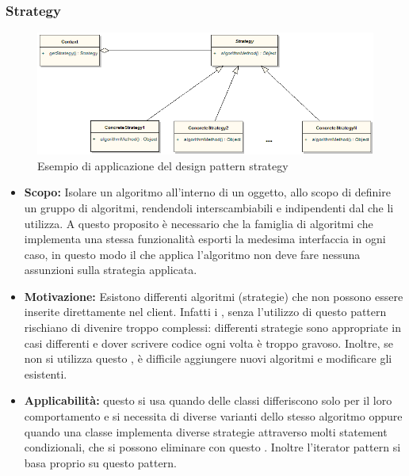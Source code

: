 \documentclass{scalatekids-article}
\begin{document}
\subsubsection{Strategy}
\begin{figure}[H]
	\begin{center}
		\includegraphics[width=1.0\textwidth, keepaspectratio]{img/designPattern/StrategyPattern.png}
		\caption{Esempio di applicazione del design pattern strategy}
	\end{center}
\end{figure}
\begin{itemize}
\item \textbf{Scopo:} Isolare un algoritmo all'interno di un oggetto, allo scopo di definire un gruppo di algoritmi, rendendoli
interscambiabili e indipendenti dal  che li utilizza. A questo proposito è necessario che la famiglia di algoritmi che implementa una stessa funzionalità esporti la medesima interfaccia in ogni caso, in questo modo il  che applica l'algoritmo non deve fare nessuna assunzioni sulla strategia applicata.
\item \textbf{Motivazione:} Esistono differenti algoritmi (strategie) che non possono essere inserite direttamente nel client. Infatti i , senza l'utilizzo di questo pattern rischiano di divenire troppo complessi: differenti strategie sono appropriate in casi differenti e dover scrivere codice ogni volta è troppo gravoso. Inoltre, se non si utilizza questo , è difficile aggiungere nuovi algoritmi e modificare gli esistenti.
\item \textbf{Applicabilità:} questo  si usa quando delle classi differiscono solo per il loro comportamento e si necessita di diverse varianti dello stesso algoritmo oppure quando una classe implementa diverse strategie attraverso molti statement condizionali, che si possono eliminare con questo . Inoltre l'iterator pattern si basa proprio su questo pattern.
\end{itemize}
\newpage
\listoftables
\newpage
\listoffigures
\end{document}
